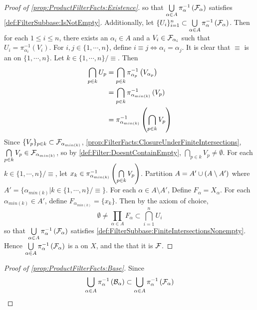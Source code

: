 \begin{prop}
\begin{proof}[Proof of \ref{prop:ProductFilterFacts:Existence}]
    so that $\bigcup\limits_{\alpha \in A} \pi_\alpha^{-1}\left( \mathcal{F}_\alpha\right)$ 
    satisfies \ref{def:FilterSubbase:IsNotEmpty}.
    Additionally, let $\{U_i\}_{i=1}^n \subset \bigcup\limits_{\alpha \in A} \pi_\alpha^{-1}\left( \mathcal{F}_\alpha\right)$.
    Then for each $1 \leq i \leq n$, there exists an $\alpha_i \in A$ 
    and a $V_i \in \mathcal{F}_{\alpha_i}$ such that 
    $U_i = \pi_{\alpha_i}^{-1}(V_i)$.
    For $i,j \in \{1,\cdots,n\}$, define $i \equiv j \iff \alpha_i = \alpha_j$.
    It is clear that $\equiv$ is an \EquivalenceRelation on $\{1,\cdots,n\}$.
    Let $k \in \{1, \cdots, n\} / \equiv$. Then 
    \begin{align*}
        \bigcap\limits_{p \in k} U_p & = \bigcap\limits_{p \in k} \pi_{\alpha_p}^{-1}\left( V_{\alpha_p}\right) \\
        & =\bigcap\limits_{p \in k} \pi_{\alpha_{min(k)}}^{-1}\left( V_{p}\right) \\
        & = \pi_{\alpha_{min(k)}}^{-1} \left( \bigcap\limits_{p \in k} V_{p}\right)
    \end{align*}
    Since $\{V_p\}_{p \in k} \subset \mathcal{F}_{\alpha_{min(k)}}$, 
    \ref{prop:FilterFacts:ClosureUnderFiniteIntersections}, 
    $\bigcap\limits_{p \in k} V_p  \in \mathcal{F}_{\alpha_{min(k)}}$, so 
    by \ref{def:Filter:DoesntContainEmpty}, $\bigcap\limits_{p \in k} V_p \neq \emptyset$. 
    For each $k \in \{1,\cdots,n\}/\equiv$, let
    $x_k \in \pi_{\alpha_{min(k)}}^{-1}\left( \bigcap\limits_{p \in k}V_p\right)$.
    Partition $A= A' \cup \left( A \setminus A'\right)$ where 
    $A' = \{\alpha_{min(k)} | k \in \{1,\cdots,n\} /\equiv\}$. 
    For each $\alpha \in A \setminus A'$, Define $F_\alpha = X_\alpha$.
    For each $\alpha_{min(k)} \in A'$, define $F_{\alpha_{min(k)}} = \{x_k\}$.
    Then by the axiom of choice, 
    \begin{equation*}
    \emptyset \neq \prod\limits_{\alpha \in A} F_\alpha \subset \bigcap\limits_{i=1}^n U_i
    \end{equation*}
    so that $\bigcup\limits_{\alpha \in A} \pi_\alpha^{-1}\left( \mathcal{F}_\alpha\right)$
    satisfies \ref{def:FilterSubbase:FiniteIntersectionsNonempty}.
    Hence $\bigcup\limits_{\alpha \in A} \pi_\alpha^{-1}\left( \mathcal{F}_\alpha\right)$ is a \FilterSubbasis
    on $X$, and the \Filter that it \FilterGenerates is $\mathcal{F}$. 
\end{proof}
\begin{proof}[Proof of \ref{prop:ProductFilterFacts:Base}]
    Since 
    \begin{equation}
        \bigcup\limits_{\alpha\in A} \pi_{\alpha}^{-1}\pa{\scB_\alpha} \subset \bigcup\limits_{\alpha\in A} \pi_{\alpha}^{-1}\pa{\scF_\alpha} 

\end{equation}
\end{proof}
\end{prop}
